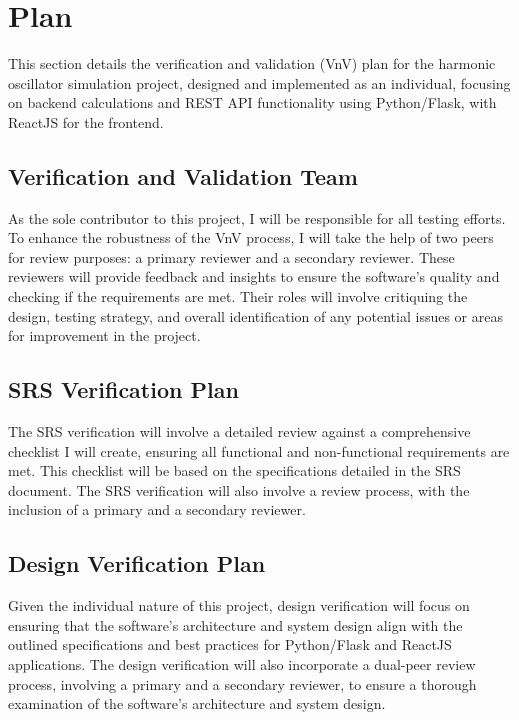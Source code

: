 \documentclass[12pt, titlepage]{article}
\begin{document}
\section{Plan}

This section details the verification and validation (VnV) plan for the harmonic 
oscillator simulation project, designed and implemented as an individual, focusing on 
backend calculations and REST API functionality using Python/Flask, with ReactJS for the 
frontend.

\subsection{Verification and Validation Team}

As the sole contributor to this project, I will be responsible for all testing efforts. 
To enhance the robustness of the VnV process, I will take the help of two peers for 
review purposes: a primary reviewer and a secondary reviewer. These reviewers will 
provide feedback and insights to ensure the software's quality and checking if the 
requirements are met. Their roles will involve critiquing the design, testing strategy, 
and overall identification of any potential issues or areas for improvement in the project.

\subsection{SRS Verification Plan}

The SRS verification will involve a detailed review against a comprehensive checklist I 
will create, ensuring all functional and non-functional requirements are met. This 
checklist will be based on the specifications detailed in the SRS document. The SRS 
verification will also involve a review process, with the inclusion of a primary and a 
secondary reviewer.

\subsection{Design Verification Plan}

Given the individual nature of this project, design verification will focus on ensuring 
that the software's architecture and system design align with the outlined specifications 
and best practices for Python/Flask and ReactJS applications. The design verification will 
also incorporate a dual-peer review process, involving a primary and a secondary reviewer, 
to ensure a thorough examination of the software's architecture and system design.
\end{document}
